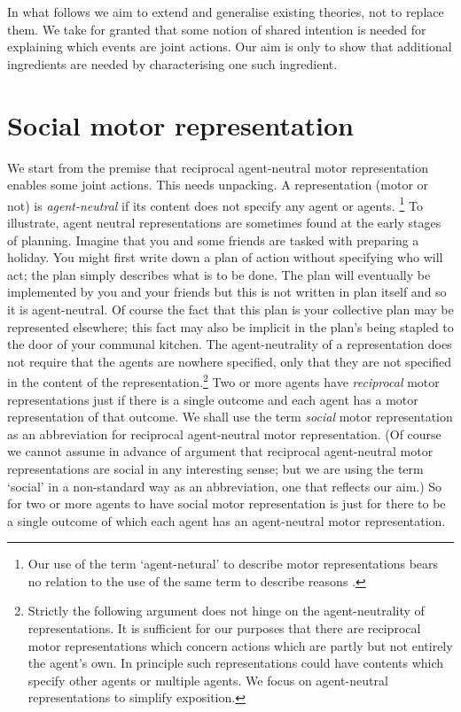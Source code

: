 \documentclass[12pt,\papersize]{extarticle}
\begin{document}
In what follows we aim to extend and generalise existing theories, not to replace them.
We take for granted that some notion of shared intention is needed for explaining which events are joint actions. 
Our aim is only to show that additional ingredients are needed by characterising one such ingredient.


\section{Social motor representation}
We start from the premise that reciprocal agent-neutral motor representation enables some joint actions.
This needs unpacking.
A representation (motor or not) is \emph{agent-neutral} if its content does not specify any agent or agents.%
\footnote{
Our use of the term `agent-netural' to describe motor representations bears no relation to the use of the same term  to describe reasons \citep[on the latter, see][]{Parfit:1984fk}.
}
To illustrate, agent neutral representations are sometimes found at the early stages of planning.
Imagine that you and some friends are tasked with preparing a holiday.  
You might first write down a plan of action without specifying who will act; the plan simply describes what is to be done.
The plan  will eventually be implemented by you and your friends
 but this is not written in plan itself  and so it is agent-neutral.
Of course the fact that this plan is your collective plan may be represented elsewhere; this fact may also be implicit in  the plan's being stapled to the door of your communal kitchen.
The agent-neutrality of a representation does not require that the agents are nowhere specified, only that they are not specified in the content of the representation.\footnote{
Strictly the following argument does not hinge on the agent-neutrality of representations.
It is sufficient for our purposes that there are reciprocal motor representations which concern actions which are partly but not entirely the agent's own.
In principle such representations could have contents which specify other agents or multiple agents.
We focus on agent-neutral representations to simplify exposition.
}
Two or more agents have \emph{reciprocal} motor representations  just if there is a single outcome and each agent has a motor representation of that outcome.
We shall use the term \emph{social} motor representation as an abbreviation for reciprocal agent-neutral motor representation.
(Of course we cannot assume in advance of argument that reciprocal agent-neutral motor representations are social in any interesting sense;
but we are using the term `social' in a non-standard way as an abbreviation, one that reflects our aim.)
So for two or more agents to have social motor representation is just for there to be a single outcome of which each agent has an agent-neutral motor representation.
\end{document}
